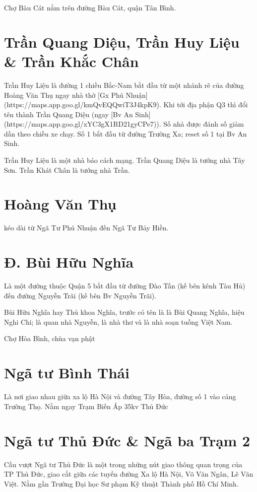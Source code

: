 Chợ Bàu Cát nằm trên đường Bàu Cát, quận Tân Bình.

\section{Trần Quang Diệu, Trần Huy Liệu \& Trần Khắc Chân}

Trần Huy Liệu là đường 1 chiều Bắc-Nam bắt đầu từ một nhánh rẽ của đường Hoàng Văn Thụ ngay nhà thờ [Gx Phú Nhuận](https://maps.app.goo.gl/kmQvEQQwiT3J4kpK9). Khi tới địa phận Q3 thì đổi tên thành Trần Quang Diệu (ngay [Bv An Sinh](https://maps.app.goo.gl/xYC3gX1RD21gyCPe7)). Số nhà được đánh số giảm dần theo chiều xe chạy. Số 1 bắt đầu từ đường Trường Xa; reset số 1 tại Bv An Sinh.

Trần Huy Liệu là một nhà báo cách mạng. Trần Quang Diệu là tướng nhà Tây Sơn. Trần Khát Chân là tướng nhà Trần.

\section{Hoàng Văn Thụ}

kéo dài từ Ngã Tư Phú Nhuận đến Ngã Tư Bảy Hiền.

\section{Đ. Bùi Hữu Nghĩa}

Là một đường thuộc Quận 5 bắt đầu từ đường Đào Tấn (kế bên kênh Tàu Hủ) đến đường Nguyễn Trãi (kế bên Bv Nguyễn Trãi).

Bùi Hữu Nghĩa hay Thủ khoa Nghĩa, trước có tên là là Bùi Quang Nghĩa, hiệu Nghi Chi; là quan nhà Nguyễn, là nhà thơ và là nhà soạn tuồng Việt Nam.

Chợ Hòa Bình, chùa vạn phật

\section{Ngã tư Bình Thái}

Là nơi giao nhau giữa xa lộ Hà Nội và đường Tây Hòa, đường số 1 vào cảng Trường Thọ. Nằm ngay Trạm Biến Áp 35kv Thủ Đức

\section{Ngã tư Thủ Đức \& Ngã ba Trạm 2}

Cầu vượt Ngã tư Thủ Đức là một trong những nút giao thông quan trọng của TP Thủ Đức, giao cắt giữa các tuyến đường Xa lộ Hà Nội, Võ Văn Ngân, Lê Văn Việt. Nằm gần Trường Đại học Sư phạm Kỹ thuật Thành phố Hồ Chí Minh.


